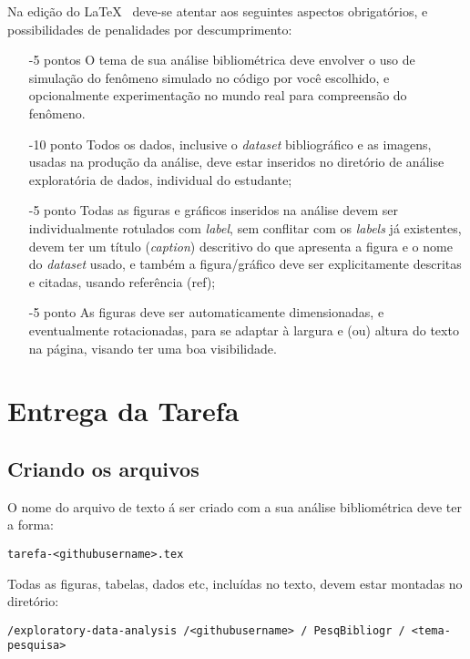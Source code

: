 \begin{description}
Na edição do \LaTeX~ deve-se atentar aos seguintes aspectos obrigatórios, e possibilidades de penalidades por descumprimento:
\begin{enumerate}
    \item [-5 pontos] O tema de sua análise bibliométrica deve envolver o uso de simulação do fenômeno simulado no código por você escolhido, e opcionalmente experimentação no mundo real para compreensão do fenômeno. 
    \item [-10 ponto] Todos os dados, inclusive o \textit{dataset} bibliográfico e as imagens, usadas na produção da análise, deve estar inseridos no diretório de análise exploratória de dados, individual do estudante;
    \item [-5 ponto] Todas as figuras e gráficos inseridos na análise devem ser individualmente rotulados com \textit{label}, sem conflitar com os \textit{labels} já existentes, devem ter um título (\textit{caption}) descritivo do que apresenta a figura e o nome do \textit{dataset} usado, e também a figura/gráfico deve ser explicitamente descritas e citadas, usando referência (ref);
    \item [-5 ponto] As figuras deve ser automaticamente dimensionadas, e eventualmente rotacionadas,  para se adaptar à largura e (ou) altura do texto na página, visando ter uma boa visibilidade. 
\end{enumerate}

\end{description}

\section{Entrega da Tarefa}

\subsection{Criando os arquivos}

O nome do arquivo de texto á ser criado com a sua análise bibliométrica deve ter a forma:

\begin{verbatim}
tarefa-<githubusername>.tex
\end{verbatim}

Todas as figuras, tabelas, dados etc, incluídas no texto, devem estar montadas no diretório:
\begin{verbatim}
/exploratory-data-analysis /<githubusername> / PesqBibliogr / <tema-pesquisa>
\end{verbatim}

